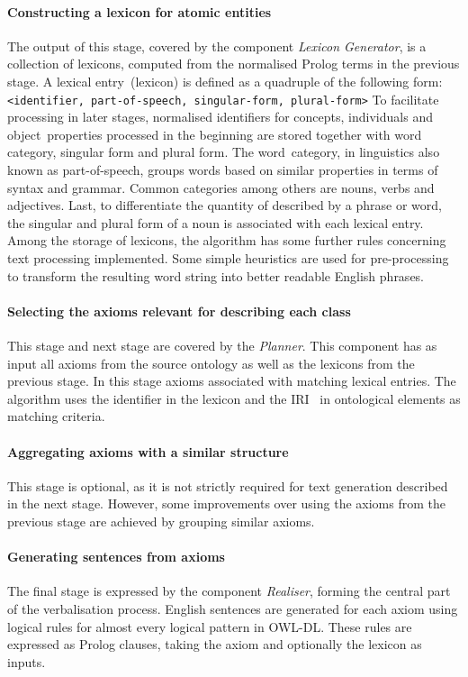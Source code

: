 \documentclass[draft,final]{vutinfth} %
\begin{document}
\paragraph{Constructing a lexicon for atomic entities} The output of this stage, covered by the component \textit{Lexicon Generator}, is a collection of lexicons, computed from the normalised Prolog terms in the previous stage. A lexical entry~(lexicon) is defined as a quadruple of the following form: \texttt{<identifier, part-of-speech, singular-form, plural-form>} To facilitate processing in later stages, normalised identifiers for concepts, individuals and object~properties processed in the beginning are stored together with word category, singular form and plural form. The word~category, in linguistics also known as part-of-speech, groups words based on similar properties in terms of syntax and grammar. Common categories among others are nouns, verbs and adjectives. Last, to differentiate the quantity of described by a phrase or word, the singular and plural form of a noun is associated with each lexical entry. 
Among the storage of lexicons, the algorithm has some further rules concerning text processing implemented.  Some simple heuristics are used for pre-processing to transform the resulting word string into better readable English phrases. 

\paragraph{Selecting the axioms relevant for describing each class} This stage and next stage are covered by the \textit{Planner}.
This component has as input all axioms from the source ontology as well as the lexicons from the previous stage. In this stage axioms associated with matching lexical entries. The algorithm uses the identifier in the lexicon and the IRI~\cite{rfc3987} in ontological elements as matching criteria. 

\paragraph{Aggregating axioms with a similar structure} This stage is optional, as it is not strictly required for text generation described in the next stage. However, some improvements over using the axioms from the previous stage are achieved by grouping similar axioms. 

\paragraph{Generating sentences from axioms} The final stage is expressed by the component \textit{Realiser}, forming the central part of the
verbalisation process. English sentences are generated for each axiom using logical rules for almost every logical pattern in OWL-DL. These rules are expressed as Prolog clauses, taking the axiom and optionally the lexicon as inputs.
\end{document}
